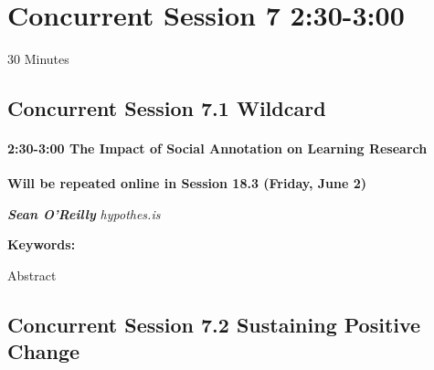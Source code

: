 \documentclass[
]{book}
\begin{document}
\hypertarget{concurrent-session-7-230-300}{%
\section*{Concurrent Session 7 \textbar{} 2:30-3:00}\label{concurrent-session-7-230-300}}

30 Minutes

\hypertarget{concurrent-session-7.1-wildcard}{%
\subsection*{Concurrent Session 7.1 \textbar{} Wildcard}\label{concurrent-session-7.1-wildcard}}

\begin{vendor}
\hypertarget{the-impact-of-social-annotation-on-learning-research}{%
\paragraph*{\texorpdfstring{2:30-3:00 \textbar{} \textbf{The Impact of
Social Annotation on Learning} \textbar{}
Research}{2:30-3:00 \textbar{} The Impact of Social Annotation on Learning \textbar{} Research}}\label{the-impact-of-social-annotation-on-learning-research}}

\textbf{Will be repeated online in Session 18.3 (Friday, June 2)}

\textbf{\emph{Sean O'Reilly}} \textbar{} \emph{hypothes.is}

\textbf{Keywords:}

Abstract
\end{vendor}

\hypertarget{concurrent-session-7.2-sustaining-positive-change}{%
\subsection*{Concurrent Session 7.2 \textbar{} Sustaining Positive Change}\label{concurrent-session-7.2-sustaining-positive-change}}
\end{document}
